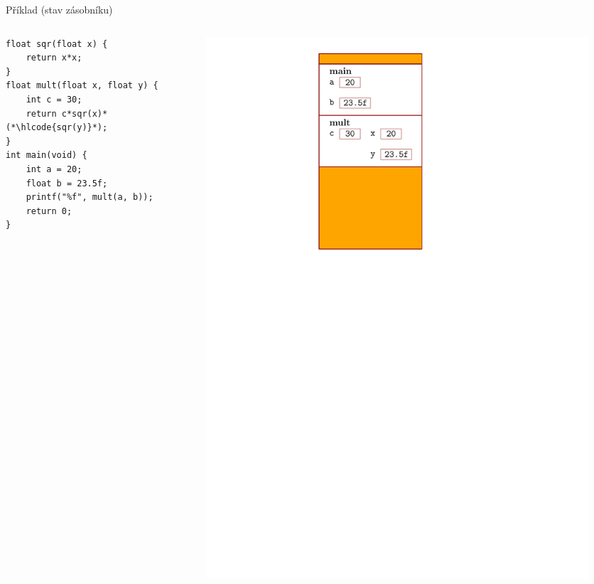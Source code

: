 \documentclass[14pt,aspectratio=169]{beamer}
\begin{document}
    \begin{frame}[t,fragile]{Příklad (stav zásobníku)}
        \begin{columns}[onlytextwidth]
            \begin{column}{0.55\textwidth}
                \begin{lstlisting}
float sqr(float x) {
    return x*x;
}
float mult(float x, float y) {
    int c = 30;
    return c*sqr(x)*(*\hlcode{sqr(y)}*);
}
int main(void) {
    int a = 20;
    float b = 23.5f;
    printf("%f", mult(a, b));
    return 0;
}
                \end{lstlisting}
            \end{column}
            \begin{column}{0.4\textwidth}
                \begin{figure}
                    \centering
                    \includegraphics[scale=.6]{images/zasobnik_stav_8.pdf}
                \end{figure}
            \end{column}
        \end{columns}
    \end{frame}
\end{document}
